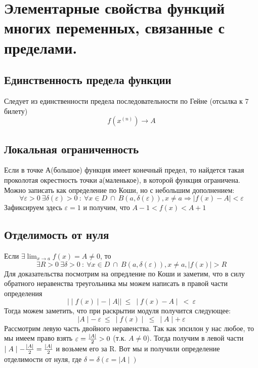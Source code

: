 \section{Элементарные свойства функций многих переменных, связанные с пределами.}

\subsection{Единственность предела функции}

Следует из единственности предела последовательности по Гейне 
(отсылка к 7 билету)
$$
f(x^{(n)}) \longrightarrow A
$$


\subsection{Локальная ограниченность}

Если в точке А(большое) функция имеет конечный предел, то найдется 
такая проколотая окрестность точки а(маленькое), в которой функция 
ограничена. Можно записать как определение по Коши, но с небольшим 
дополнением:
$$
\forall \varepsilon > 0 \ \exists \delta(\varepsilon) > 0
\ : \ \forall x\in D \ \cap \ B(a,\delta(\varepsilon)), x\ne a
\Rightarrow \mid f(x) - A \mid < \varepsilon
$$
Зафиксируем здесь $\varepsilon = 1$ и получим, что 
$A-1<f(x)<A+1$


\subsection{Отделимость от нуля}

Если $\exists \lim_{x\to a}{f(x)} = A \ne 0$, то 
$$
\exists R>0 \ \exists \delta > 0 \ : \ \forall x\in D \ \cap \ 
B(a,\delta(\varepsilon)), x\ne a, \mid f(x) \mid > R
$$
Для доказательства посмотрим на опредление по Коши и заметим, что 
в силу обратного неравенства треугольника мы можем написать в 
правой части определения 
$$
\vert\mid f(x)\mid - \mid A\mid\vert \ \leq \ \mid f(x) - A\mid \ < \ \varepsilon
$$
Тогда можем заметить, что при раскрытии модуля получится следующее:
$$
\mid A\mid - \ \varepsilon \ \leq \ \mid f(x)\mid \ \leq \ \mid A\mid + \ \varepsilon
$$
Рассмотрим левую часть двойного неравенства. Так как эпсилон у нас любое, то мы имеем право взять 
$\varepsilon = {\mid A\mid\over2} > 0 \ $(т.к. $A\ne0$). Тогда получим в левой части
$\mid A\mid - {\mid A\mid\over2} = {\mid A\mid\over2}$ и возьмем его за R. Вот мы и получили
определение отделимости от нуля, где $\delta = \delta(\varepsilon = \mid A\mid)$


